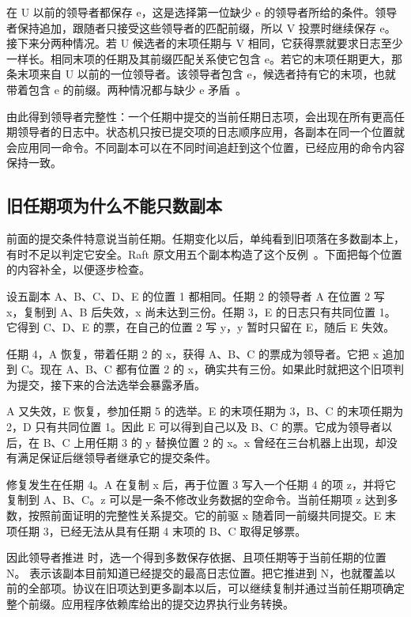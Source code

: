 在 U 以前的领导者都保存 e，这是选择第一位缺少 e 的领导者所给的条件。领导者保持追加，跟随者只接受这些领导者的匹配前缀，所以 V 投票时继续保存 e。接下来分两种情况。若 U 候选者的末项任期与 V 相同，它获得票就要求日志至少一样长。相同末项的任期及其前缀匹配关系使它包含 e。若它的末项任期更大，那条末项来自 U 以前的一位领导者。该领导者包含 e，候选者持有它的末项，也就带着包含 e 的前缀。两种情况都与缺少 e 矛盾~\cite{raft}。


由此得到领导者完整性：一个任期中提交的当前任期日志项，会出现在所有更高任期领导者的日志中。状态机只按已提交项的日志顺序应用，各副本在同一个位置就会应用同一命令。不同副本可以在不同时间追赶到这个位置，已经应用的命令内容保持一致。

\subsection*{旧任期项为什么不能只数副本}

前面的提交条件特意说当前任期。任期变化以后，单纯看到旧项落在多数副本上，有时不足以判定它安全。Raft 原文用五个副本构造了这个反例~\cite{raft}。下面把每个位置的内容补全，以便逐步检查。

设五副本 A、B、C、D、E 的位置 1 都相同。任期 2 的领导者 A 在位置 2 写 x，复制到 A、B 后失效，x 尚未达到三份。任期 3，E 的日志只有共同位置 1。它得到 C、D、E 的票，在自己的位置 2 写 y，y 暂时只留在 E，随后 E 失效。

任期 4，A 恢复，带着任期 2 的 x，获得 A、B、C 的票成为领导者。它把 x 追加到 C。现在 A、B、C 都有位置 2 的 x，确实共有三份。如果此时就把这个旧项判为提交，接下来的合法选举会暴露矛盾。

A 又失效，E 恢复，参加任期 5 的选举。E 的末项任期为 3，B、C 的末项任期为 2，D 只有共同位置 1。因此 E 可以得到自己以及 B、C 的票。它成为领导者以后，在 B、C 上用任期 3 的 y 替换位置 2 的 x。x 曾经在三台机器上出现，却没有满足保证后继领导者继承它的提交条件。


修复发生在任期 4。A 在复制 x 后，再于位置 3 写入一个任期 4 的项 z，并将它复制到 A、B、C。z 可以是一条不修改业务数据的空命令。当前任期项 z 达到多数，按照前面证明的完整性关系提交。它的前驱 x 随着同一前缀共同提交。E 末项任期 3，已经无法从具有任期 4 末项的 B、C 取得足够票。

因此领导者推进  时，选一个得到多数保存依据、且项任期等于当前任期的位置 N。 表示该副本目前知道已经提交的最高日志位置。把它推进到 N，也就覆盖以前的全部项。协议在旧项达到更多副本以后，可以继续复制并通过当前任期项确定整个前缀。应用程序依赖库给出的提交边界执行业务转换。

